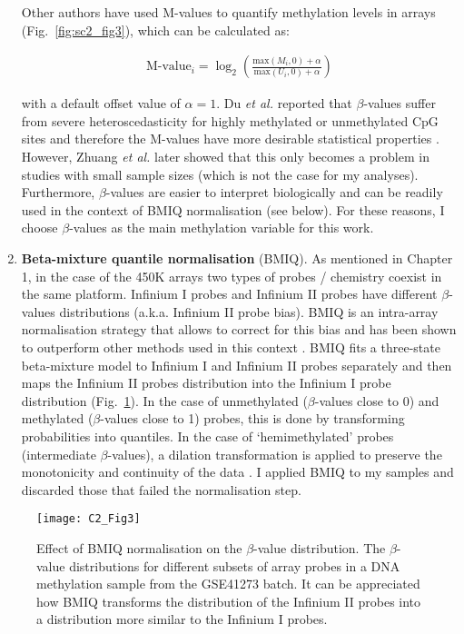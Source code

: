 \begin{enumerate}
	Other authors have used M-values to quantify methylation levels in arrays (Fig.~\ref{fig:sc2_fig3}), which can be calculated as:
	
	\begin{align}
	\text{M-value}_i = \log_2 \left(\frac{\text{max}(M_i,0) + \alpha}{\text{max}(U_i,0) + \alpha}\right)
	\end{align}
	
	with a default offset value of $\alpha=1$.  Du \textit{et al.} reported that $\beta$-values suffer from severe heteroscedasticity for highly methylated or unmethylated CpG sites and therefore the M-values have more desirable statistical properties \cite{Du2010}. However, Zhuang \textit{et al.} later showed that this only becomes a problem in studies with small sample sizes \cite{Zhuang2012} (which is not the case for my analyses). Furthermore, $\beta$-values are easier to interpret biologically and can be readily used in the context of BMIQ normalisation (see below). For these reasons, I choose $\beta$-values as the main methylation variable for this work.
	
	\item \textbf{Beta-mixture quantile normalisation} (\acrshort{BMIQ}). As mentioned in Chapter 1, in the case of the 450K arrays two types of probes / chemistry coexist in the same platform. Infinium I probes and Infinium II probes have different $\beta$-values distributions (a.k.a. Infinium II probe bias). BMIQ is an intra-array normalisation strategy that allows to correct for this bias and has been shown to outperform other methods used in this context \cite{Teschendorff2012,Dedeurwaerder2011,Touleimat2012,Maksimovic2012}. BMIQ fits a three-state beta-mixture model to Infinium I and Infinium II probes separately and then maps the Infinium II probes distribution into the Infinium I probe distribution (Fig.~\ref{fig:c2_fig3}). In the case of unmethylated ($\beta$-values close to 0) and methylated ($\beta$-values close to 1) probes, this is done by transforming probabilities into quantiles. In the case of `hemimethylated' probes (intermediate $\beta$-values), a dilation transformation is applied to preserve the monotonicity and continuity of the data \cite{Teschendorff2012}. I applied BMIQ to my samples and discarded those that failed the normalisation step.  
	
\end{enumerate}

\bigskip
 
\begin{figure}[htbp!] 
	\centering    
	\texttt{[image: C2\_Fig3]}
	\caption[Effect of BMIQ normalisation on the $\beta$-value distribution]{Effect of BMIQ normalisation on the $\beta$-value distribution. The $\beta$-value distributions for different subsets of array probes in a DNA methylation sample from the GSE41273 batch. It can be appreciated how BMIQ transforms the distribution of the Infinium II probes into a distribution more similar to the Infinium I probes.}
	\label{fig:c2_fig3}
\end{figure}

